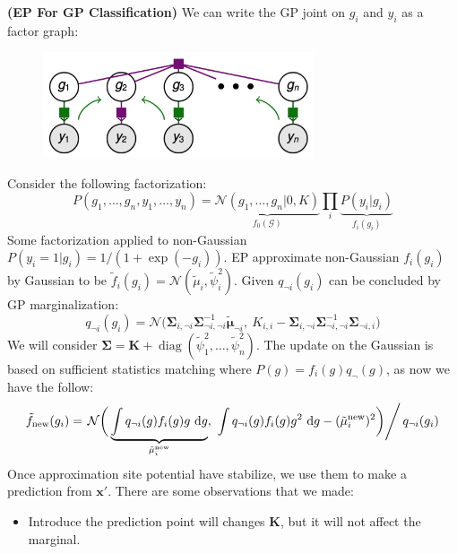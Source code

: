 \begin{remark}{\textbf{(EP For GP Classification)}}
    We can write the GP joint on $g_i$ and $y_i$ as a factor graph:
    \begin{figure}[H]
        \centering
        \includegraphics[width=8cm]{img/img15.png}
    \end{figure}  
    Consider the following factorization:
    \begin{equation*}
        P(g_1,\dots,g_n,y_1,\dots,y_n) = \underbrace{\mathcal{N}(g_1,\dots,g_n|0, K)}_{f_0(\mathcal{G})} \prod_i \underbrace{P(y_i|g_i)}_{f_i(g_i)}
    \end{equation*}
    Some factorization applied to non-Gaussian $P(y_i = 1 | g_i) = 1/(1+\exp(-g_i))$. EP approximate non-Gaussian $f_i(g_i)$ by Gaussian to be $\tilde{f}_i(g_i) = \mathcal{N}(\tilde{\mu}_i, \tilde{\psi}_i^2)$. Given $q_{\neg i}(g_i)$ can be concluded by GP marginalization:
    \begin{equation*}
        q_{\neg i}(g_i) = \mathcal{N}\Big( \boldsymbol \Sigma_{i, \neg i}\boldsymbol \Sigma^{-1}_{\neg i, \neg i} \tilde{\boldsymbol \mu}_{\neg i}, \ K_{i,i} - \boldsymbol \Sigma_{i, \neg i} \boldsymbol \Sigma^{-1}_{\neg i, \neg i}\boldsymbol \Sigma_{\neg i, i} \Big)
    \end{equation*}
    We will consider $\boldsymbol \Sigma = \boldsymbol K + \operatorname{diag}(\tilde{\psi}^2_1,\dots,\tilde{\psi}^2_n)$. The update on the Gaussian is based on sufficient statistics matching where $P(g) = f_i(g)q_\neg(g)$, as now we have the follow:
    \begin{equation*}
        \tilde{f}_\text{new}(g_i) = \left.\mathcal{N}\bigg( \underbrace{\int q_{\neg i}(g)f_i(g)g\ \mathrm{d} g}_{\tilde{\mu}^\text{new}_i}, \ \int q_{\neg i}(g)f_i(g)g^2\ \mathrm{d} g -  (\tilde{\mu}^\text{new}_i)^2 \bigg)\right/q_{\neg i}(g_i)
    \end{equation*}
    Once approximation site potential have stabilize, we use them to make a prediction from $\boldsymbol x'$. There are some observations that we made:
    \begin{itemize}
        \item Introduce the prediction point will changes $\boldsymbol K$, but it will not affect the marginal. 

\end{itemize}
\end{remark}
